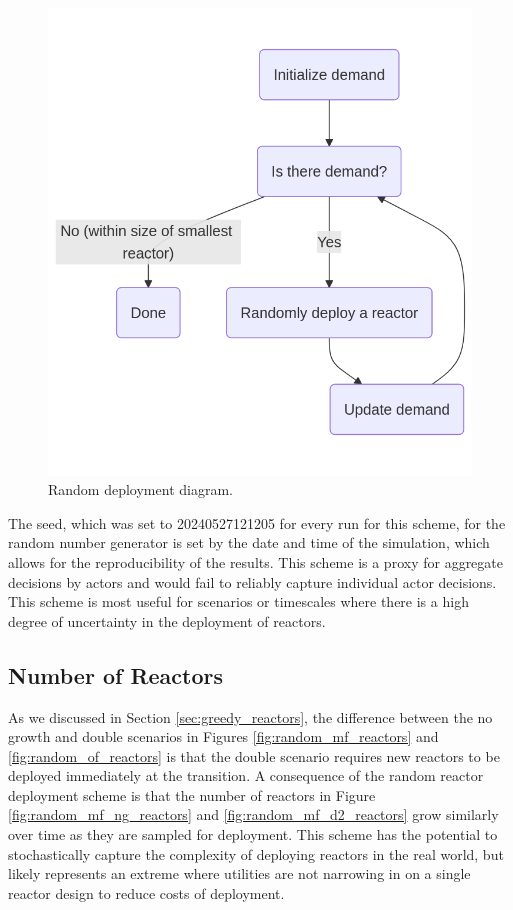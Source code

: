 \begin{figure}[H]
    \centering
    \includegraphics[scale=0.3]{images/schemes/random_diagram.png}
    \caption{Random deployment diagram.}
    \label{fig:random_diagram}
\end{figure}

The seed, which was set to 20240527121205 for every run for this scheme, for
the random number generator is set by the date and time of the simulation,
which allows for the reproducibility of the results. This scheme is a proxy for
aggregate decisions by actors and would fail to reliably capture individual
actor decisions. This scheme is most useful for scenarios or timescales where
there is a high degree of uncertainty in the deployment of reactors.


\subsection{Number of Reactors}
\label{sec:random_reactors}

As we discussed in Section \ref{sec:greedy_reactors}, the difference between the no growth and double scenarios in Figures \ref{fig:random_mf_reactors} and \ref{fig:random_of_reactors} is that the double scenario requires new reactors to be deployed immediately at the transition. A consequence of the random reactor deployment scheme is that the number of reactors in Figure \ref{fig:random_mf_ng_reactors} and \ref{fig:random_mf_d2_reactors} grow similarly over time as they are sampled for deployment. This scheme has the potential to stochastically capture the complexity of deploying reactors in the real world, but likely represents an extreme where utilities are not narrowing in on a single reactor design to reduce costs of deployment.

